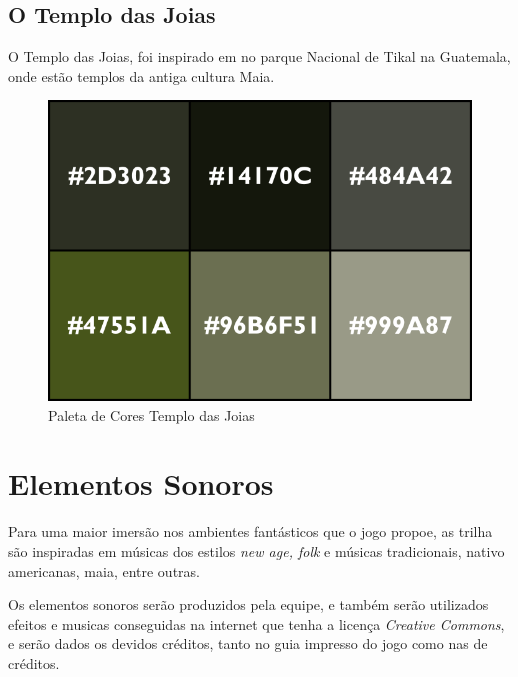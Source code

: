 \clearpage

\subsection{O Templo das Joias}

O Templo das Joias, foi inspirado em no parque Nacional de Tikal na Guatemala, onde estão templos da antiga cultura Maia.

\begin{figure}[htb]
	\caption{\label{fig_paletaTikal}Paleta de Cores Templo das Joias}
	\begin{center}
	    \includegraphics[width=\textwidth/2]{imagens/PaletaTikal.png}
	\end{center}
\end{figure}



\section{Elementos Sonoros}

Para uma maior imersão nos ambientes fantásticos que o jogo propoe, as trilha são inspiradas em músicas dos estilos \textit{new age, folk} e músicas tradicionais, nativo americanas, maia, entre outras.

Os elementos sonoros serão produzidos pela equipe, e também serão utilizados efeitos e musicas conseguidas na internet que tenha a licença \textit{Creative Commons}, e serão dados os devidos créditos, tanto no guia impresso do jogo como nas de créditos.
